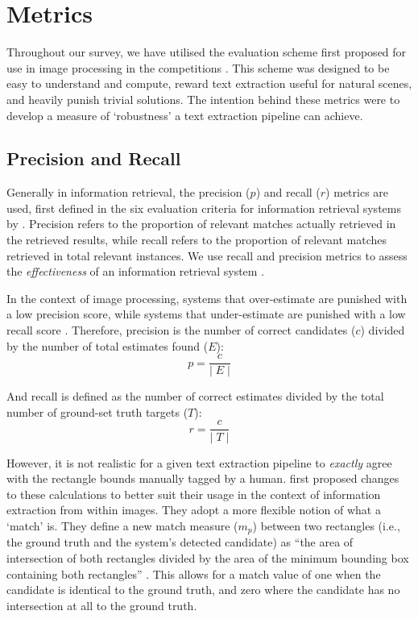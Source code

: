 \section{Metrics}
\label{sec:background:metrics}

Throughout our survey, we have utilised the evaluation scheme first proposed for use in image processing in the  competitions \citep{Lucas:2003iw, Lucas:2005bq, Shahab:2011hq, Karatzas:2013by, Karatzas:2015tj}. This scheme was designed to be easy to understand and compute, reward text extraction useful for natural scenes, and heavily punish trivial solutions. The intention behind these metrics were to develop a measure of `robustness' a text extraction pipeline can achieve.

\subsection{Precision and Recall}
\label{sec:background:metrics:precision_and_recall}

Generally in information retrieval, the precision ($p$) and recall ($r$) metrics are used, first defined in the six evaluation criteria for information retrieval systems by \citet{Cleverdon:1966vd}. Precision refers to the proportion of relevant matches actually retrieved in the retrieved results, while recall refers to the proportion of relevant matches retrieved in total relevant instances. We use recall and precision metrics to assess the \textit{effectiveness} of an information retrieval system \citep{Rijsbergen:1979dw}.

In the context of image processing, systems that over-estimate are punished with a low precision score, while systems that under-estimate are punished with a low recall score \citep{Lucas:2003iw}. Therefore, precision is the number of correct candidates ($c$) divided by the number of total estimates found ($E$):
\begin{equation*}
  p = \frac{c}{\lvert\;E\;\rvert}
\end{equation*}

And recall is defined as the number of correct estimates divided by the total number of ground-set truth targets ($T$):
\begin{equation*}
  r = \frac{c}{\lvert\;T\;\rvert}
\end{equation*}

However, it is not realistic for a given text extraction pipeline to \textit{exactly} agree with the rectangle bounds manually tagged by a human. \citet{Lucas:2003iw} first proposed changes to these calculations to better suit their usage in the context of information extraction from within images. They adopt a more flexible notion of what a `match' is. They define a new match measure ($m_{p}$) between two rectangles (i.e., the ground truth and the system's detected candidate) as ``the area of intersection of both rectangles divided by the area of the minimum bounding box containing both rectangles'' \citep{Lucas:2003iw}. This allows for a match value of one when the candidate is identical to the ground truth, and zero where the candidate has no intersection at all to the ground truth.

